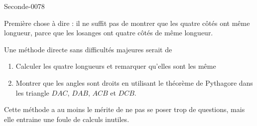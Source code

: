 
\begin{corrige}{Seconde-0078}

    Première chose à dire : il ne suffit pas de montrer que les quatre côtés ont même longueur, parce que les losanges ont quatre côtés de même longueur.

    Une méthode directe sans difficultés majeures serait de 
    \begin{enumerate}
        \item
            Calculer les quatre longueurs et remarquer qu'elles sont les même
        \item
            Montrer que les angles sont droits en utilisant le théorème de Pythagore dans les triangle \( DAC\), \( DAB\), \( ACB\) et \( DCB\).
    \end{enumerate}
    Cette méthode a au moins le mérite de ne pas se poser trop de questions, mais elle entraine une foule de calculs inutiles.


\end{corrige}
